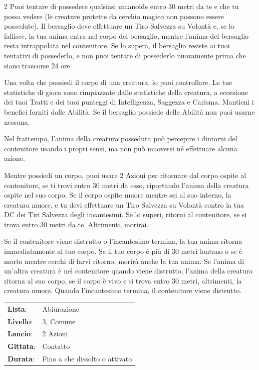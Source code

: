 \begin{multicols}{2}
Puoi tentare di possedere qualsiasi umanoide entro 30 metri da te e che tu possa vedere (le creature protette da cerchio magico non possono essere possedute). Il bersaglio deve effettuare un Tiro Salvezza su Volontà e, se lo fallisce, la tua anima entra nel corpo del bersaglio, mentre l'anima del bersaglio resta intrappolata nel contenitore. Se lo supera, il bersaglio resiste ai tuoi tentativi di possederlo, e non puoi tentare di possederlo nuovamente prima che siano trascorse 24 ore.

Una volta che possiedi il corpo di una creatura, lo puoi controllare. Le tue statistiche di gioco sono rimpiazzate dalle statistiche della creatura, a eccezione dei tuoi Tratti e dei tuoi punteggi di Intelligenza, Saggezza e Carisma. Mantieni i benefici forniti dalle Abilità. Se il bersaglio possiede delle Abilità non puoi usarne nessuna.

Nel frattempo, l'anima della creatura posseduta può percepire i dintorni del contenitore usando i propri sensi, ma non può muoversi né effettuare alcuna azione.

Mentre possiedi un corpo, puoi usare 2 Azioni per ritornare dal corpo ospite al contenitore, se ti trovi entro 30 metri da esso, riportando l'anima della creatura ospite nel suo corpo. Se il corpo ospite muore mentre sei al suo interno, la creatura muore, e tu devi effettuare un Tiro Salvezza su Volontà contro la tua DC dei Tiri Salvezza degli incantesimi. Se lo superi, ritorni al contenitore, se si trova entro 30 metri da te. Altrimenti, morirai.

Se il contenitore viene distrutto o l'incantesimo termina, la tua anima ritorna immediatamente al tuo corpo. Se il tuo corpo è più di 30 metri lontano o se è morto mentre cerchi di farvi ritorno, morirà anche la tua anima. Se l'anima di un'altra creatura è nel contenitore quando viene distrutto, l'anima della creatura ritorna al suo corpo, se il corpo è vivo e si trova entro 30 metri, altrimenti, la creatura muore. Quando l'incantesimo termina, il contenitore viene distrutto.

\noindent\begin{tabularx}{\linewidth}{p{1.9cm}X}
	\rowcolor{gray!20}\textbf{Lista}: & Abiurazione \\
	\textbf{Livello}: & 3, Comune \\
	\rowcolor{gray!20}\textbf{Lancio}: & 2 Azioni \\
	\textbf{Gittata}: & Contatto \\
	\rowcolor{gray!20}\textbf{Durata}: & Fino a che dissolto o attivato \\
\end{tabularx}\smallskip


\end{multicols}
